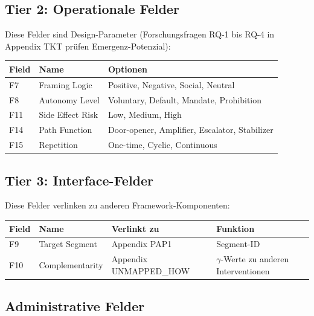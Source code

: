 \subsection{Tier 2: Operationale Felder}

Diese Felder sind Design-Parameter (Forschungsfragen RQ-1 bis RQ-4 in Appendix TKT prüfen Emergenz-Potenzial):

\begin{center}
\renewcommand{\arraystretch}{1.3}
\begin{tabular}{@{}lll@{}}
\toprule
\textbf{Field} & \textbf{Name} & \textbf{Optionen} \\
\midrule
F7 & Framing Logic & Positive, Negative, Social, Neutral \\
F8 & Autonomy Level & Voluntary, Default, Mandate, Prohibition \\
F11 & Side Effect Risk & Low, Medium, High \\
F14 & Path Function & Door-opener, Amplifier, Escalator, Stabilizer \\
F15 & Repetition & One-time, Cyclic, Continuous \\
\bottomrule
\end{tabular}
\end{center}


\subsection{Tier 3: Interface-Felder}

Diese Felder verlinken zu anderen Framework-Komponenten:

\begin{center}
\renewcommand{\arraystretch}{1.3}
\begin{tabular}{@{}llll@{}}
\toprule
\textbf{Field} & \textbf{Name} & \textbf{Verlinkt zu} & \textbf{Funktion} \\
\midrule
F9 & Target Segment & Appendix PAP1 & Segment-ID \\
F10 & Complementarity & Appendix UNMAPPED_HOW & $\gamma$-Werte zu anderen Interventionen \\
\bottomrule
\end{tabular}
\end{center}


\subsection{Administrative Felder}

